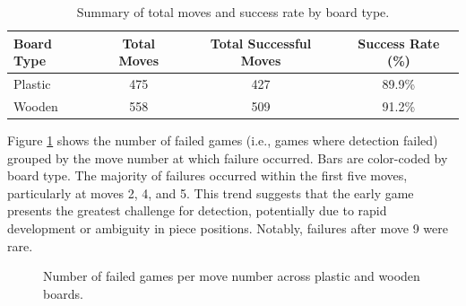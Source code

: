 \begin{table}[htbp]
\centering
\caption[Move detection accuracy board type]{Summary of total moves and success rate by board type.}
\label{tab:board-type-accuracy}
\begin{tabular}{lccc}
\toprule
\textbf{Board Type} & \textbf{Total Moves} & \textbf{Total Successful Moves} & \textbf{Success Rate (\%)} \\
\midrule
Plastic & 475 & 427 & 89.9\% \\
Wooden  & 558 & 509 & 91.2\% \\
\bottomrule
\end{tabular}
\end{table}


Figure \ref{fig:move-failures} shows the number of failed games (i.e., games where detection failed) grouped by the move number at which failure occurred. Bars are color-coded by board type. The majority of failures occurred within the first five moves, particularly at moves 2, 4, and 5. This trend suggests that the early game presents the greatest challenge for detection, potentially due to rapid development or ambiguity in piece positions. Notably, failures after move 9 were rare. \\


\begin{figure}[h!]
\centering
{}
\caption[Detection failures per move number]{Number of failed games per move number across plastic and wooden boards.}
\label{fig:move-failures}
\end{figure}


